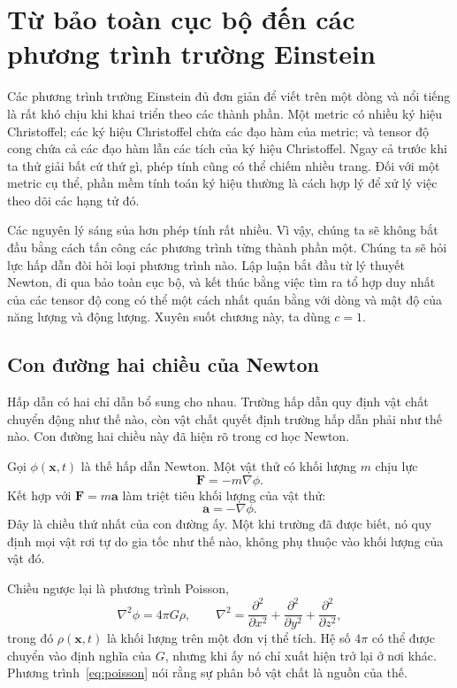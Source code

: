 \chapter{Từ bảo toàn cục bộ đến các phương trình trường Einstein}

Các phương trình trường Einstein đủ đơn giản để viết trên một dòng và nổi tiếng là rất khó chịu khi khai triển theo các thành phần. Một metric có nhiều ký hiệu Christoffel; các ký hiệu Christoffel chứa các đạo hàm của metric; và tensor độ cong chứa cả các đạo hàm lẫn các tích của ký hiệu Christoffel. Ngay cả trước khi ta thử giải bất cứ thứ gì, phép tính cũng có thể chiếm nhiều trang. Đối với một metric cụ thể, phần mềm tính toán ký hiệu thường là cách hợp lý để xử lý việc theo dõi các hạng tử đó.

Các nguyên lý sáng sủa hơn phép tính rất nhiều. Vì vậy, chúng ta sẽ không bắt đầu bằng cách tấn công các phương trình từng thành phần một. Chúng ta sẽ hỏi lực hấp dẫn đòi hỏi loại phương trình nào. Lập luận bắt đầu từ lý thuyết Newton, đi qua bảo toàn cục bộ, và kết thúc bằng việc tìm ra tổ hợp duy nhất của các tensor độ cong có thể một cách nhất quán bằng với dòng và mật độ của năng lượng và động lượng. Xuyên suốt chương này, ta dùng \(c=1\).

\section{Con đường hai chiều của Newton}

Hấp dẫn có hai chỉ dẫn bổ sung cho nhau. Trường hấp dẫn quy định vật chất chuyển động như thế nào, còn vật chất quyết định trường hấp dẫn phải như thế nào. Con đường hai chiều này đã hiện rõ trong cơ học Newton.

Gọi \(\phi(\mathbf{x},t)\) là thế hấp dẫn Newton. Một vật thử có khối lượng \(m\) chịu lực
\begin{equation}
 \mathbf{F}=-m\nabla\phi.
\end{equation}
Kết hợp với \(\mathbf{F}=m\mathbf{a}\) làm triệt tiêu khối lượng của vật thử:
\begin{equation}
 \mathbf{a}=-\nabla\phi.
\end{equation}
Đây là chiều thứ nhất của con đường ấy. Một khi trường đã được biết, nó quy định mọi vật rơi tự do gia tốc như thế nào, không phụ thuộc vào khối lượng của vật đó.

Chiều ngược lại là phương trình Poisson,
\begin{equation}
 \nabla^2\phi=4\pi G\rho,
 \qquad
 \nabla^2=
 \frac{\partial^2}{\partial x^2}
 +\frac{\partial^2}{\partial y^2}
 +\frac{\partial^2}{\partial z^2},
 \label{eq:poisson}
\end{equation}
trong đó \(\rho(\mathbf{x},t)\) là khối lượng trên một đơn vị thể tích. Hệ số \(4\pi\) có thể được chuyển vào định nghĩa của \(G\), nhưng khi ấy nó chỉ xuất hiện trở lại ở nơi khác. Phương trình~\eqref{eq:poisson} nói rằng sự phân bố vật chất là nguồn của thế.

